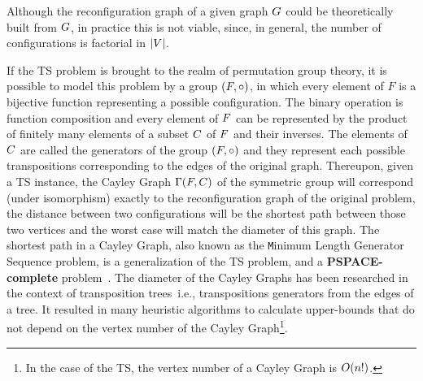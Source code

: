 \documentclass[msc,english,table,xcdraw]{ppgccufmg}
\begin{document}
Although the reconfiguration graph of a given graph $G$ could be theoretically built from $G$, in practice this is not viable, since, in general, the number of configurations is factorial in $|V|$.

If the TS problem is brought to the realm of permutation group theory, it is
possible to model this problem by a group $(F,\circ)$, in which every element 
of $F$ is a bijective function representing a possible configuration. 
The binary operation is function composition and every element of $F$ 
can be represented by the product of finitely many elements of a subset 
$C$ of $F$ and their inverses.
The elements of $C$ are called the generators of the group $(F,\circ)$ 
and they represent each possible transpositions corresponding to the edges 
of the original graph.
Thereupon, given a TS instance, the Cayley Graph $\Gamma(F,C)$ of the symmetric 
group will correspond (under isomorphism) exactly to the reconfiguration graph 
of the original problem, the distance between two configurations will be the 
shortest path between those two vertices and the worst case will match the 
diameter of this graph.
The shortest path in a Cayley Graph, also known as the {\texttt Minimum Length
Generator Sequence} problem, is a generalization of the TS problem, and a 
\textbf{PSPACE-complete} problem~\citep{Jerrum:1985}.
The diameter of the Cayley Graphs has been researched in the context of 
transposition trees~\citep{Akers:1989, Cooperman:1992,
Bafna:1998,Ganesan:Diameter:2012, Ganesan:Strictness:2012,Chitturi:2013,
Kraft:2015,Chitturi:2019}\textemdash i.e., transpositions generators from the 
edges of a tree.
It resulted in many heuristic algorithms to calculate upper-bounds that
do not depend on the vertex number of the Cayley Graph\footnote{In the case of
the TS, the vertex number of a Cayley Graph is $O(n!)$.}.


\end{document}

